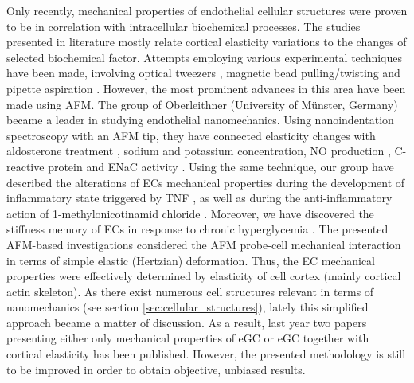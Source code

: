 Only recently, mechanical properties of endothelial cellular structures were proven to be in correlation with intracellular biochemical processes. The studies presented in literature mostly relate cortical elasticity variations to the changes of selected biochemical factor. 
Attempts employing various experimental techniques have been made, involving optical tweezers \cite{Wang2006, Hayakawa2008}, magnetic bead pulling/twisting \cite{Bausch2001, Zeng2010} and pipette aspiration \cite{Sato1987, Zeng2011}. 
However, the most prominent advances in this area have been made using \gls{AFM}. The group of Oberleithner (University of M\"{u}nster, Germany) became a leader in studying endothelial nanomechanics. Using nanoindentation spectroscopy with an \gls{AFM} tip, they have connected elasticity changes with aldosterone treatment \cite{Oberleithner2005}, sodium \cite{Oberleithner2007a} and potassium \cite{Oberleithner2009} concentration, \gls{NO} production \cite{Fels2010_trois}, C-reactive protein \cite{Kusche-Vihrog2011} and \gls{ENaC} activity \cite{Kusche-Vihrog2008}. Using the same technique, our group have described the alterations of \glspl{EC} mechanical properties during the development of inflammatory state triggered by \gls{TNF} \cite{Szczygiel2011}, as well as during the anti-inflammatory action of 1-methylonicotinamid chloride \cite{Kolodziejczyk2013}. Moreover, we have discovered the stiffness memory of \glspl{EC} in response to chronic hyperglycemia \cite{Targosz-Korecka2013}. 
The presented \gls{AFM}-based investigations considered the \gls{AFM} probe-cell mechanical interaction in terms of simple elastic (Hertzian) deformation. Thus, the \gls{EC} mechanical properties were effectively determined by elasticity of cell cortex (mainly cortical actin skeleton). As there exist numerous cell structures relevant in terms of nanomechanics (see section \ref{sec:cellular_structures}), lately this simplified approach became a matter of discussion. As a result, last year two papers presenting either only mechanical properties of \gls{eGC} \cite{Wiesinger2013} or \gls{eGC} together with cortical elasticity has been published. However, the presented methodology is still to be improved in order to obtain objective, unbiased results.

